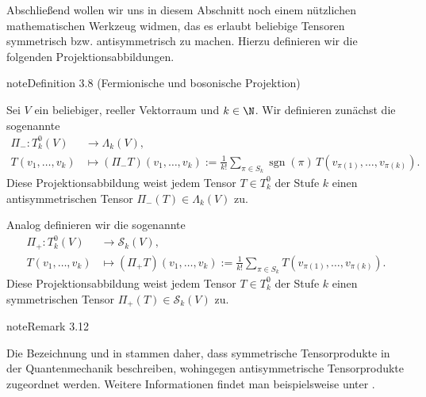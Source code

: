 \documentclass[letterpaper,10pt,german]{jupyterBook}
\begin{document}
\sphinxAtStartPar
Abschließend wollen wir uns in diesem Abschnitt noch einem nützlichen mathematischen Werkzeug widmen, das es erlaubt beliebige Tensoren symmetrisch bzw. antisymmetrisch zu machen.
Hierzu definieren wir die folgenden Projektionsabbildungen.
\label{vektoranalysis/tensor:def:fermionischeProjektion}
\begin{sphinxadmonition}{note}{Definition 3.8 (Fermionische und bosonische Projektion)}



\sphinxAtStartPar
Sei \(V\) ein beliebiger, reeller Vektorraum und \(k \in \N\).
Wir definieren zunächst die sogenannte 
\begin{equation*}
\begin{split}\Pi_- \colon T_k^0(V) &\rightarrow \Lambda_k(V), \\
T(v_1, \ldots, v_k) &\mapsto (\Pi_- T)(v_1, \ldots, v_k) := \frac{1}{k!} \sum_{\pi \in S_k} \operatorname{sgn}(\pi) \, T(v_{\pi(1)}, \ldots, v_{\pi(k)}).\end{split}
\end{equation*}
\sphinxAtStartPar
Diese Projektionsabbildung weist jedem Tensor \(T\in T_k^0\) der Stufe \(k\) einen antisymmetrischen Tensor \(\Pi_-(T) \in \Lambda_k(V)\) zu.

\sphinxAtStartPar
Analog definieren wir die sogenannte 
\begin{equation*}
\begin{split}\Pi_+ \colon T_k^0(V) &\rightarrow \mathcal{S}_k(V), \\
T(v_1, \ldots, v_k) &\mapsto (\Pi_+ T)(v_1, \ldots, v_k) := \frac{1}{k!} \sum_{\pi \in S_k} T(v_{\pi(1)}, \ldots, v_{\pi(k)}).\end{split}
\end{equation*}
\sphinxAtStartPar
Diese Projektionsabbildung weist jedem Tensor \(T\in T_k^0\) der Stufe \(k\) einen symmetrischen Tensor \(\Pi_+(T) \in \mathcal{S}_k(V)\) zu.
\end{sphinxadmonition}
\label{vektoranalysis/tensor:remark-32}
\begin{sphinxadmonition}{note}{Remark 3.12}



\sphinxAtStartPar
Die Bezeichnung  und  in {\hyperref[\detokenize{vektoranalysis/tensor:def:fermionischeProjektion}]{}} stammen daher, dass symmetrische Tensorprodukte  in der Quantenmechanik beschreiben, wohingegen antisymmetrische Tensorprodukte  zugeordnet werden. Weitere Informationen findet man beispielsweise unter .
\end{sphinxadmonition}
\end{document}
